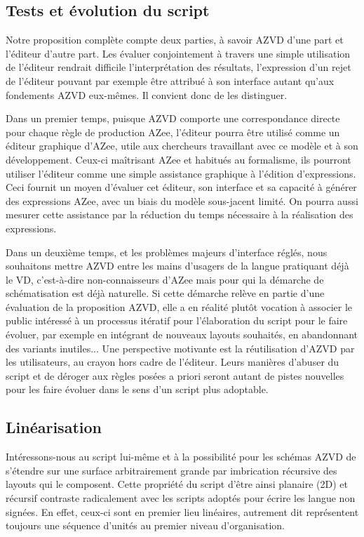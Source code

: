 \documentclass[french,utf8x]{article}
\begin{document}
\subsection{Tests et évolution du script}

Notre proposition complète compte deux parties, à savoir AZVD d'une part et l'éditeur d'autre part.
Les évaluer conjointement à travers une simple utilisation de l'éditeur rendrait difficile l'interprétation des résultats, l'expression d'un rejet de l'éditeur pouvant par exemple être attribué à son interface autant qu'aux fondements AZVD eux-mêmes.
Il convient donc de les distinguer.

Dans un premier temps, puisque AZVD comporte une correspondance directe pour chaque règle de production AZee, l'éditeur pourra être utilisé comme un éditeur graphique d'AZee, utile aux chercheurs travaillant avec ce modèle et à son développement.
Ceux-ci maîtrisant AZee et habitués au formalisme, ils pourront utiliser l'éditeur comme une simple assistance graphique à l'édition d'expressions.
Ceci fournit un moyen d'évaluer cet éditeur, son interface et sa capacité à générer des expressions AZee, avec un biais du modèle sous-jacent limité.
On pourra aussi mesurer cette assistance par la réduction du temps nécessaire à la réalisation des expressions.

Dans un deuxième temps, et les problèmes majeurs d'interface réglés, nous souhaitons mettre AZVD entre les mains d'usagers de la langue pratiquant déjà le VD, c'est-à-dire non-connaisseurs d'AZee mais pour qui la démarche de schématisation est déjà naturelle.
Si cette démarche relève en partie d'une évaluation de la proposition AZVD, elle a en réalité plutôt vocation à associer le public intéressé à un processus itératif pour l'élaboration du script pour le faire évoluer, par exemple en intégrant de nouveaux layouts souhaités, en abandonnant des variants inutiles...
Une perspective motivante est la réutilisation d'AZVD par les utilisateurs, au crayon hors cadre de l'éditeur.
Leurs manières d'abuser du script et de déroger aux règles posées a priori seront autant de pistes nouvelles pour les faire évoluer dans le sens d'un script plus adoptable.


\subsection{Linéarisation}

Intéressons-nous au script lui-même et à la possibilité pour les schémas AZVD de s'étendre sur une surface arbitrairement grande par imbrication récursive des layouts qui le composent.
Cette propriété du script d'être ainsi planaire (2D) et récursif contraste radicalement avec les scripts adoptés pour écrire les langue non signées.
En effet, ceux-ci sont en premier lieu linéaires, autrement dit représentent toujours une séquence d'unités au premier niveau d'organisation.
\end{document}
